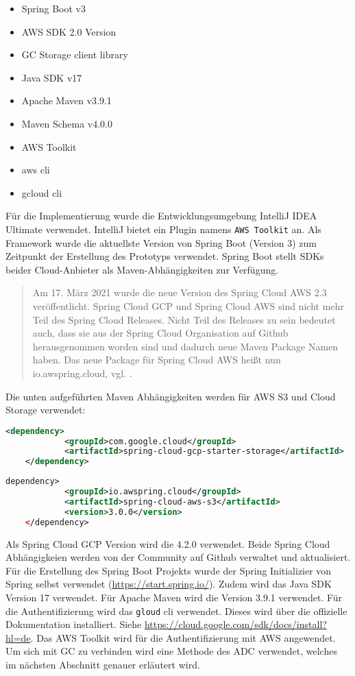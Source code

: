 \begin{itemize}
	\item Spring Boot v3
	\item AWS SDK 2.0 Version
	\item GC Storage client library
	\item Java SDK v17
	\item Apache Maven v3.9.1
	\item Maven Schema v4.0.0
	\item AWS Toolkit
	\item aws cli
	\item gcloud cli
\end{itemize}

Für die Implementierung wurde die Entwicklungsumgebung IntelliJ IDEA Ultimate verwendet. IntelliJ bietet ein Plugin namens \verb|AWS Toolkit| an. Als Framework wurde die aktuellste Version von Spring Boot (Version 3) zum Zeitpunkt der Erstellung des Prototyps verwendet. Spring Boot stellt SDKs beider Cloud-Anbieter als Maven-Abhängigkeiten zur Verfügung.

\begin{quote}
	Am 17. März 2021 wurde die neue Version des Spring Cloud AWS 2.3 veröffentlicht. Spring Cloud GCP und Spring Cloud AWS sind nicht mehr Teil des Spring Cloud Releases. Nicht Teil des Releases zu sein bedeutet auch, dass sie aus der Spring Cloud Organisation auf Github herausgenommen worden sind und dadurch neue Maven Package Namen haben. Das neue Package für Spring Cloud AWS heißt nun \glqq io.awspring.cloud\grqq, vgl. \cite{spring-cloud-announce}. 
\end{quote}

Die unten aufgeführten Maven Abhängigkeiten werden für AWS S3 und Cloud Storage verwendet:

\begin{lstlisting}[language=XML]
	<dependency>
        	<groupId>com.google.cloud</groupId>
        	<artifactId>spring-cloud-gcp-starter-storage</artifactId>
    </dependency>
\end{lstlisting}

\begin{lstlisting}[language=XML]
	dependency>
        	<groupId>io.awspring.cloud</groupId>
        	<artifactId>spring-cloud-aws-s3</artifactId>
        	<version>3.0.0</version>
    </dependency>
\end{lstlisting}

Als Spring Cloud GCP Version wird die 4.2.0 verwendet. Beide Spring Cloud Abhängigkeien werden von der Community auf Github verwaltet und aktualisiert. Für die Erstellung des Spring Boot Projekts wurde der Spring Initializier von Spring selbst verwendet (\url{https://start.spring.io/}). Zudem wird das Java SDK Version 17 verwendet. Für Apache Maven wird die Version 3.9.1 verwendet. Für die Authentifizierung wird das \verb|gloud| cli verwendet. Dieses wird über die offizielle Dokumentation installiert. Siehe \url{https://cloud.google.com/sdk/docs/install?hl=de}. Das AWS Toolkit wird für die Authentifizierung mit AWS angewendet. Um sich mit GC zu verbinden wird eine Methode des ADC verwendet, welches im nächsten Abschnitt genauer erläutert wird.

